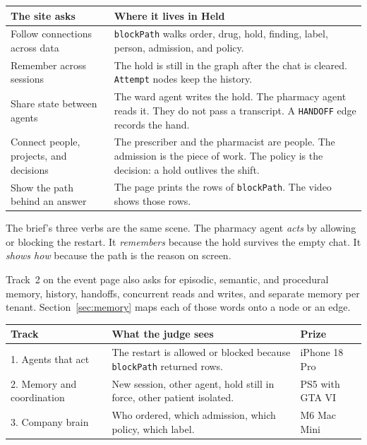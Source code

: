 \documentclass[11pt,a4paper]{article}
\newcommand{\code}[1]{\texttt{#1}}
\begin{document}
\begin{center}
\begin{tabularx}{\textwidth}{@{}lX@{}}
\toprule
\textbf{The site asks} & \textbf{Where it lives in Held} \\
\midrule
Follow connections across data &
\code{blockPath} walks order, drug, hold, finding, label, person, admission, and policy. \\
Remember across sessions &
The hold is still in the graph after the chat is cleared. \code{Attempt} nodes keep the history. \\
Share state between agents &
The ward agent writes the hold. The pharmacy agent reads it. They do not pass a transcript. A \code{HANDOFF} edge records the hand. \\
Connect people, projects, and decisions &
The prescriber and the pharmacist are people. The admission is the piece of work. The policy is the decision: a hold outlives the shift. \\
Show the path behind an answer &
The page prints the rows of \code{blockPath}. The video shows those rows. \\
\bottomrule
\end{tabularx}
\end{center}

The brief's three verbs are the same scene. The pharmacy agent \emph{acts} by allowing or blocking the restart. It \emph{remembers} because the hold survives the empty chat. It \emph{shows how} because the path is the reason on screen.

Track~2 on the event page also asks for episodic, semantic, and procedural memory, history, handoffs, concurrent reads and writes, and separate memory per tenant. Section~\ref{sec:memory} maps each of those words onto a node or an edge.

\begin{center}
\begin{tabularx}{\textwidth}{@{}lXl@{}}
\toprule
\textbf{Track} & \textbf{What the judge sees} & \textbf{Prize} \\
\midrule
1. Agents that act &
The restart is allowed or blocked because \code{blockPath} returned rows. &
iPhone 18 Pro \\
2. Memory and coordination &
New session, other agent, hold still in force, other patient isolated. &
PS5 with GTA VI \\
3. Company brain &
Who ordered, which admission, which policy, which label. &
M6 Mac Mini \\
\bottomrule
\end{tabularx}
\end{center}
\end{document}
